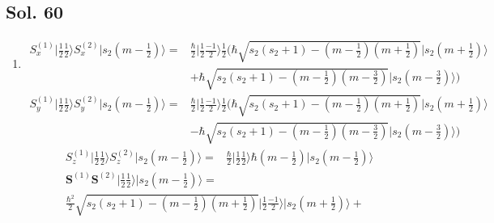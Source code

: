         \subsection*{Sol. 60}
        \begin{enumerate}
        \item 
        
        \begin{align*}
            S_x^{(1)}\bigg|\frac{1}{2}\frac{1}{2}\bigg\rangle
            S_x^{(2)}\bigg|s_2\left(m-\frac{1}{2}\right)\bigg\rangle
            =&\frac{\hbar}{2}\bigg|\frac{1}{2}\frac{-1}{2}\bigg\rangle
            \frac{1}{2}\bigg(
            \hbar\sqrt{s_2(s_2+1)-(m-\frac{1}{2})(m+\frac{1}{2})}
            \bigg|s_2\left(m+\frac{1}{2}\right)\bigg\rangle
            \\&+
            \hbar\sqrt{s_2(s_2+1)-(m-\frac{1}{2})(m-\frac{3}{2})}
            \bigg|s_2\left(m-\frac{3}{2}\right)\bigg\rangle
            \bigg)
        \end{align*}
        \begin{align*}
            S_y^{(1)}\bigg|\frac{1}{2}\frac{1}{2}\bigg\rangle
            S_y^{(2)}\bigg|s_2\left(m-\frac{1}{2}\right)\bigg\rangle
            =&\frac{\hbar}{2}\bigg|\frac{1}{2}\frac{-1}{2}\bigg\rangle
            \frac{1}{2}\bigg(
            \hbar\sqrt{s_2(s_2+1)-(m-\frac{1}{2})(m+\frac{1}{2})}
            \bigg|s_2\left(m+\frac{1}{2}\right)\bigg\rangle
            \\&-
            \hbar\sqrt{s_2(s_2+1)-(m-\frac{1}{2})(m-\frac{3}{2})}
            \bigg|s_2\left(m-\frac{3}{2}\right)\bigg\rangle
            \bigg)
        \end{align*}
        \begin{align*}
            S_z^{(1)}\bigg|\frac{1}{2}\frac{1}{2}\bigg\rangle
            S_z^{(2)}\bigg|s_2\left(m-\frac{1}{2}\right)\bigg\rangle
            =&\frac{\hbar}{2}\bigg|\frac{1}{2}\frac{1}{2}\bigg\rangle
            \hbar\left(m-\frac{1}{2}\right)
            \bigg|s_2\left(m-\frac{1}{2}\right)\bigg\rangle
        \end{align*}
        \begin{align*}
            \bm S^{(1)}\bm S^{(2)}\bigg|\frac{1}{2}\frac{1}{2}\bigg\rangle
            \bigg|s_2\left(m-\frac{1}{2}\right)\bigg\rangle
            =&\\
            \frac{\hbar^2}{2}\sqrt{s_2(s_2+1)-(m-\frac{1}{2})(m+\frac{1}{2})}\bigg|\frac{1}{2}\frac{-1}{2}\bigg\rangle
            \bigg|s_2\left(m+\frac{1}{2}\right)\bigg\rangle
            +

\end{align*}
\end{enumerate}
